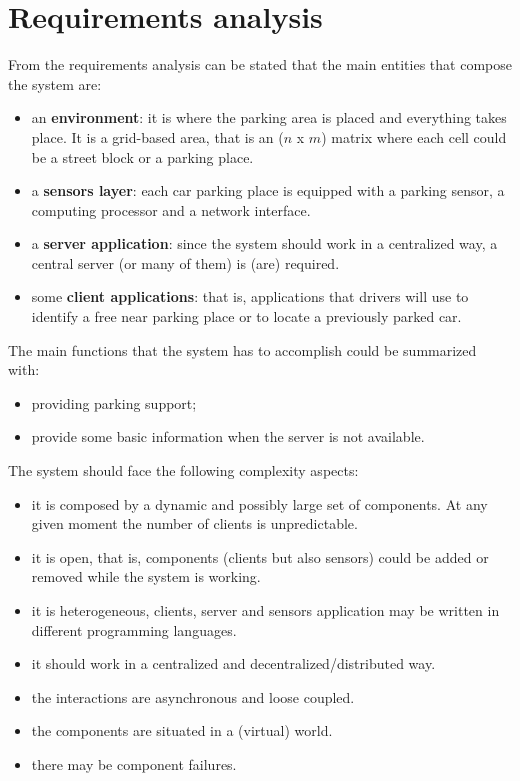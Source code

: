\documentclass[11pt]{article}
\begin{document}
\section{Requirements analysis}
From the requirements analysis can be stated that the main entities that compose the system are:
\begin{itemize}
\item an \textbf{environment}: it is where the parking area is placed and everything takes place. It is a grid-based area, that is an ($n$ x $m$) matrix where each cell could be a street block or a parking place.
\item a \textbf{sensors layer}: each car parking place is equipped with a parking sensor, a computing processor and a network interface.
\item a \textbf{server application}: since the system should work in a centralized way, a central server (or many of them) is (are) required.
\item some \textbf{client applications}: that is, applications that drivers will use to identify a free near parking place or to locate a previously parked car.
\end{itemize}
The main functions that the system has to accomplish could be summarized with:
\begin{itemize}
\item providing parking support;
\item provide some basic information when the server is not available.
\end{itemize}

The system should face the following complexity aspects:
\begin{itemize}
\item it is composed by a dynamic and possibly large set of components. At any given moment the number of clients is unpredictable.
\item it is open, that is, components (clients but also sensors) could be added or removed while the system is working.
\item it is heterogeneous, clients, server and sensors application may be written in different programming languages.
\item it should work in a centralized and decentralized/distributed way.
\item the interactions are asynchronous and loose coupled.
\item the components are situated in a (virtual) world.
\item there may be component failures.
\end{itemize}
\end{document}
